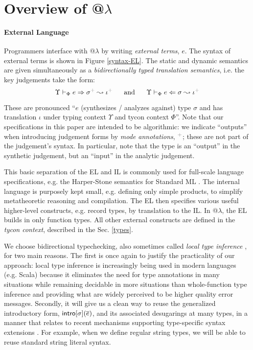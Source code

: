 \documentclass[10pt,preprint]{sigplanconf}
\newcommand{\moutput}{^{\color{gray}+}}
\begin{document}
\section{Overview of @$\lambda$}\label{atlam}\label{overview}
\paragraph{External Language}
Programmers interface with @$\lambda$ by writing \emph{external terms}, $e$. The syntax of external terms is shown in Figure \ref{syntax-EL}. %
The static and dynamic semantics are given simultaneously as a \emph{bidirectionally typed translation semantics}, i.e. the key judgements take the form:  \[\esynX{e}{\st\moutput}{\iota\moutput} ~~~~~\text{and}~~~~~ \eanaX{e}{\st}{\iota\moutput}\]
\noindent

These are pronounced ``$e$ (synthesizes / analyzes against) type $\sigma$ and has  translation $\iota$ under typing context $\Upsilon$ and tycon context $\Phi$''. Note that our specifications in this paper are intended to be algorithmic: we indicate ``outputs'' when introducing judgement forms by \emph{mode annotations}, $\moutput$; these are not part of the judgement's syntax. In particular, note that the type is an ``output'' in the synthetic judgement, but an ``input'' in  the analytic judgement.

This basic separation of the EL and IL is commonly used for full-scale language specifications, e.g. the Harper-Stone semantics for Standard ML \cite{Harper00atype-theoretic}. The internal language is purposely kept small, e.g. defining only simple products, to simplify metatheoretic reasoning and compilation. The EL then specifies various useful higher-level constructs, e.g. record types, by translation to the IL. In @$\lambda$, the EL builds in only function types. All other external constructs are defined in the \emph{tycon context}, described in the Sec. \ref{types}. 

We choose bidirectional typechecking, also sometimes called \emph{local type inference} \cite{Pierce:2000:LTI:345099.345100}, for two main reasons. The first is once again to justify the practicality of our approach: local type inference is increasingly being used in modern languages (e.g. Scala) because it eliminates the need for type annotations in many situations while remaining decidable in more situations than whole-function type inference and providing what are widely perceived to be higher quality error messages. Secondly, it will give us a clean way to reuse the generalized introductory form, ${\sf intro}[\sigma](\overline{e})$, and its associated desugarings at many types, in a manner that relates to recent mechanisms supporting type-specific syntax extensions \cite{TSLs}. For example, when we define regular string types, we will be able to reuse standard string literal syntax. 
\end{document}
